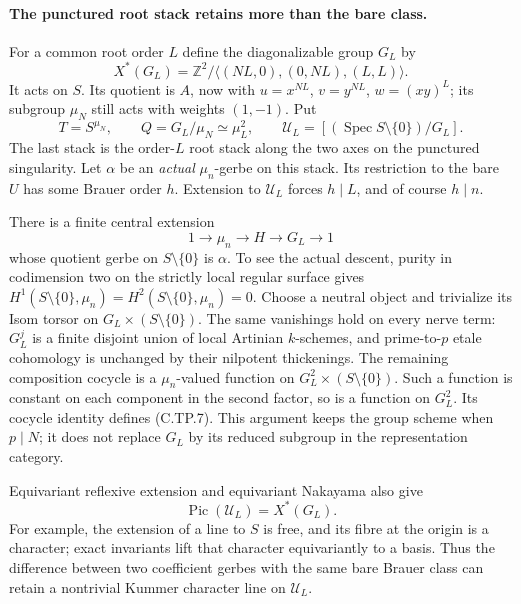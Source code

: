 \paragraph{The punctured root stack retains more than the bare class.}
For a common root order $L$ define the diagonalizable group $G_L$ by
\[
 X^*(G_L)=\mathbb Z^2/
       \langle(NL,0),(0,NL),(L,L)\rangle.
                                                        \tag{C.TP.5}
\]
It acts on $S$.  Its quotient is $A$, now with
$u=x^{NL}$, $v=y^{NL}$, $w=(xy)^L$; its subgroup $\mu_N$
still acts with weights $(1,-1)$.  Put
\[
 T=S^{\mu_N},\qquad Q=G_L/\mu_N\simeq\mu_L^2,
 \qquad \mathcal U_L=[(\operatorname{Spec}S\setminus\{0\})/G_L].
                                                        \tag{C.TP.6}
\]
The last stack is the order-$L$ root stack along the two axes on
the punctured singularity.  Let $\alpha$ be an \emph{actual}
$\mu_n$-gerbe on this stack.  Its restriction to the bare $U$ has
some Brauer order $h$.  Extension to $\mathcal U_L$ forces
$h\mid L$, and of course $h\mid n$.

There is a finite central extension
\[
       1\longrightarrow\mu_n\longrightarrow H
                    \longrightarrow G_L\longrightarrow1       \tag{C.TP.7}
\]
whose quotient gerbe on $S\setminus\{0\}$ is $\alpha$.
To see the actual descent, purity in codimension two on the strictly
local regular surface gives
$H^1(S\setminus\{0\},\mu_n)=H^2(S\setminus\{0\},\mu_n)=0$.
Choose a neutral object and trivialize its Isom torsor on
$G_L\times(S\setminus\{0\})$.  The same vanishings hold on
every nerve term: $G_L^j$ is a finite disjoint union of local
Artinian $k$-schemes, and prime-to-$p$ etale cohomology is unchanged
by their nilpotent thickenings.  The remaining composition cocycle
is a $\mu_n$-valued function on $G_L^2\times(S\setminus\{0\})$.
Such a function is constant on each component in the second factor,
so is a function on $G_L^2$.  Its cocycle identity defines (C.TP.7).
This argument keeps the group scheme when $p\mid N$; it does not
replace $G_L$ by its reduced subgroup in the representation category.

Equivariant reflexive extension and equivariant Nakayama also give
\[
                  \operatorname{Pic}(\mathcal U_L)=X^*(G_L).
                                                        \tag{C.TP.8}
\]
For example, the extension of a line to $S$ is free, and its fibre
at the origin is a character; exact invariants lift that character
equivariantly to a basis.  Thus the difference between two
coefficient gerbes with the same bare Brauer class can retain a
nontrivial Kummer character line on $\mathcal U_L$.

